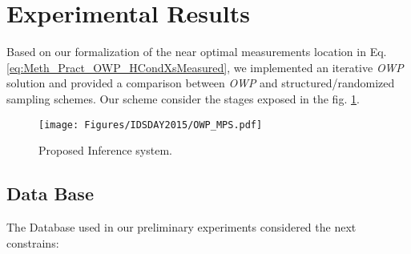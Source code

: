 \section{Experimental Results}

Based on our formalization of the near optimal measurements location in Eq. \eqref{eq:Meth_Pract_OWP_HCondXsMeasured}, we implemented an iterative \emph{OWP} solution and provided a comparison between \emph{OWP} and structured/randomized sampling schemes. Our scheme consider the stages exposed in the fig. \ref{fig:SytemOWP_MPS}.

\begin{figure}[h!]
    \centering
    \texttt{[image: Figures/IDSDAY2015/OWP\_MPS.pdf]}
	\caption{\label{fig:SytemOWP_MPS} Proposed Inference system.}
 \end{figure}


\subsection{Data Base}

The Database used in our preliminary experiments considered the next constrains: \




